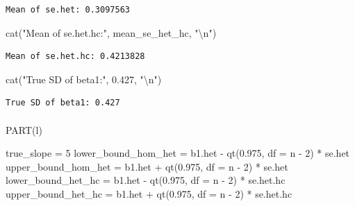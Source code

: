 \documentclass[
  11pt,
]{article}
\makeatletter
\let\oldparagraph\paragraph
\renewcommand{\paragraph}{
    \@ifstar
      \xxxParagraphStar
      \xxxParagraphNoStar
  }
\newcommand{\xxxParagraphStar}[1]{\oldparagraph*{#1}\mbox{}}
\newcommand{\xxxParagraphNoStar}[1]{\oldparagraph{#1}\mbox{}}
\newenvironment{Shaded}{\begin{snugshade}}{\end{snugshade}}
\newcommand{\AttributeTok}[1]{\textcolor[rgb]{0.40,0.45,0.13}{#1}}
\newcommand{\DecValTok}[1]{\textcolor[rgb]{0.68,0.00,0.00}{#1}}
\newcommand{\FloatTok}[1]{\textcolor[rgb]{0.68,0.00,0.00}{#1}}
\newcommand{\FunctionTok}[1]{\textcolor[rgb]{0.28,0.35,0.67}{#1}}
\newcommand{\NormalTok}[1]{\textcolor[rgb]{0.00,0.23,0.31}{#1}}
\newcommand{\OtherTok}[1]{\textcolor[rgb]{0.00,0.23,0.31}{#1}}
\newcommand{\SpecialCharTok}[1]{\textcolor[rgb]{0.37,0.37,0.37}{#1}}
\newcommand{\StringTok}[1]{\textcolor[rgb]{0.13,0.47,0.30}{#1}}
\makeatother
\begin{document}
\begin{verbatim}
Mean of se.het: 0.3097563 
\end{verbatim}

\begin{Shaded}
\begin{Highlighting}[]
\FunctionTok{cat}\NormalTok{(}\StringTok{"Mean of se.het.hc:"}\NormalTok{, mean\_se\_het\_hc, }\StringTok{"}\SpecialCharTok{\textbackslash{}n}\StringTok{"}\NormalTok{)}
\end{Highlighting}
\end{Shaded}

\begin{verbatim}
Mean of se.het.hc: 0.4213828 
\end{verbatim}

\begin{Shaded}
\begin{Highlighting}[]
\FunctionTok{cat}\NormalTok{(}\StringTok{"True SD of beta1:"}\NormalTok{, }\FloatTok{0.427}\NormalTok{, }\StringTok{"}\SpecialCharTok{\textbackslash{}n}\StringTok{"}\NormalTok{)}
\end{Highlighting}
\end{Shaded}

\begin{verbatim}
True SD of beta1: 0.427 
\end{verbatim}

\paragraph{PART(l)}\label{partl}

\begin{Shaded}
\begin{Highlighting}[]
\NormalTok{true\_slope }\OtherTok{=} \DecValTok{5}
\NormalTok{lower\_bound\_hom\_het }\OtherTok{=}\NormalTok{ b1.het }\SpecialCharTok{{-}} \FunctionTok{qt}\NormalTok{(}\FloatTok{0.975}\NormalTok{, }\AttributeTok{df =}\NormalTok{ n }\SpecialCharTok{{-}} \DecValTok{2}\NormalTok{) }\SpecialCharTok{*}\NormalTok{ se.het}
\NormalTok{upper\_bound\_hom\_het }\OtherTok{=}\NormalTok{ b1.het }\SpecialCharTok{+} \FunctionTok{qt}\NormalTok{(}\FloatTok{0.975}\NormalTok{, }\AttributeTok{df =}\NormalTok{ n }\SpecialCharTok{{-}} \DecValTok{2}\NormalTok{) }\SpecialCharTok{*}\NormalTok{ se.het}
\NormalTok{lower\_bound\_het\_hc }\OtherTok{=}\NormalTok{ b1.het }\SpecialCharTok{{-}} \FunctionTok{qt}\NormalTok{(}\FloatTok{0.975}\NormalTok{, }\AttributeTok{df =}\NormalTok{ n }\SpecialCharTok{{-}} \DecValTok{2}\NormalTok{) }\SpecialCharTok{*}\NormalTok{ se.het.hc}
\NormalTok{upper\_bound\_het\_hc }\OtherTok{=}\NormalTok{ b1.het }\SpecialCharTok{+} \FunctionTok{qt}\NormalTok{(}\FloatTok{0.975}\NormalTok{, }\AttributeTok{df =}\NormalTok{ n }\SpecialCharTok{{-}} \DecValTok{2}\NormalTok{) }\SpecialCharTok{*}\NormalTok{ se.het.hc}
\end{Highlighting}
\end{Shaded}
\end{document}
